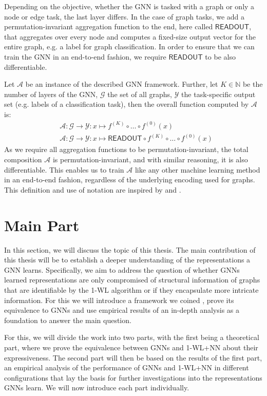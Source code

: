 \documentclass[11pt, dvipsnames, DIV=12]{scrreprt}
\theoremstyle{definition}
\newcommand{\wlnn}{\text{1-WL+NN }}
\begin{document}
Depending on the objective, whether the GNN is tasked with a graph or only a node or edge task, the last layer differs. In the case of graph tasks, we add a permutation-invariant aggregation function to the end, here called $\textsf{READOUT}$, that aggregates over every node and computes a fixed-size output vector for the entire graph, e.g. a label for graph classification. In order to ensure that we can train the GNN in an end-to-end fashion, we require $\textsf{READOUT}$ to be also differentiable.

Let $\mathcal{A}$ be an instance of the described GNN framework. Further, let $K \in \mathbb{N}$ be the number of layers of the GNN, $\mathcal{G}$ the set of all graphs, $\mathcal{Y}$ the task-specific output set (e.g. labels of a classification task), then the overall function computed by $\mathcal{A}$ is:
\begin{align}
    &\mathcal{A}: \mathcal{G} \rightarrow \mathcal{Y}: x \mapsto f^{(K)} \circ \ldots \circ f^{(0)}(x)\\
    &\mathcal{A}: \mathcal{G} \rightarrow \mathcal{Y}: x \mapsto \textsf{READOUT} \circ f^{(K)} \circ \ldots \circ f^{(0)}(x)
\end{align}
As we require all aggregation functions to be permutation-invariant, the total composition $\mathcal{A}$ is permutation-invariant, and with similar reasoning, it is also differentiable. This enables us to train $\mathcal{A}$ like any other machine learning method in an end-to-end fashion, regardless of the underlying encoding used for graphs. This definition and use of notation are inspired by \cite{Morris2018} and \cite{Xu2018}.


\section{Main Part}
In this section, we will discuss the topic of this thesis. The main contribution of this thesis will be to establish a deeper understanding of the representations a GNN learns. Specifically, we aim to address the question of whether GNNs learned representations are only compromised of structural information of graphs that are identifiable by the 1-WL algorithm or if they encapsulate more intricate information. For this we will introduce a framework we coined \wlnn, prove its equivalence to GNNs and use empirical results of an in-depth analysis as a foundation to answer the main question.

For this, we will divide the work into two parts, with the first being a theoretical part, where we prove the equivalence between GNNs and 1-WL+NN about their expressiveness. The second part will then be based on the results of the first part, an empirical analysis of the performance of GNNs and 1-WL+NN in different configurations that lay the basis for further investigations into the representations GNNs learn. We will now introduce each part individually.
\end{document}
